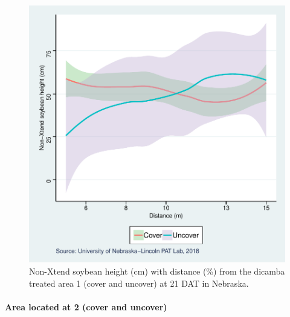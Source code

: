 \documentclass[]{article}
\let\oldparagraph\paragraph
\renewcommand{\paragraph}[1]{\oldparagraph{#1}\mbox{}}
\begin{document}
\begin{figure}
\centering
\includegraphics{Report_files/figure-latex/unnamed-chunk-81-1.pdf}
\caption{Non-Xtend soybean height (cm) with distance (\%) from the
dicamba treated area 1 (cover and uncover) at 21 DAT in Nebraska.}
\end{figure}

\newpage

\pagebreak

\paragraph{Area located at 2 (cover and
uncover)}\label{area-located-at-2-cover-and-uncover}
\end{document}
